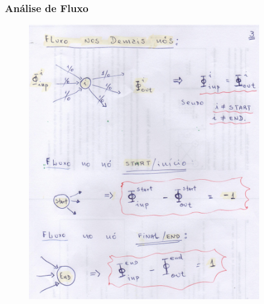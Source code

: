 \documentclass{beamer}
\begin{document}
\begin{frame}
	\frametitle{Análise de Fluxo}
	
	\begin{figure}[ht!]
		\centering
		\includegraphics[width=0.9\textwidth , height=0.85\textheight]{13_fluxo_nos_S_E.pdf}
	\end{figure}
	
\end{frame}
\end{document}
